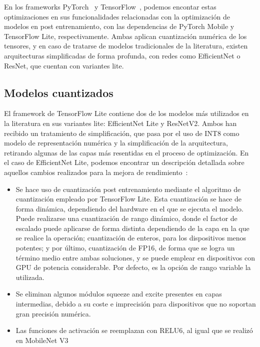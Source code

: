 En los frameworks PyTorch~\cite{paszke2019pytorch} y TensorFlow~\cite{tensorflow2015-whitepaper}, podemos encontar estas optimizaciones en sus funcionalidades relacionadas con la optimización de modelos en post entrenamiento, con las dependencias de PyTorch Mobile y TensorFlow Lite, respectivamente. Ambas aplican cuantización numérica de los tensores, y en caso de tratarse de modelos tradicionales de la literatura, existen arquitecturas simplificadas de forma profunda, con redes como EfficientNet o ResNet, que cuentan con variantes lite.

\subsection{Modelos cuantizados}

El framework de TensorFlow Lite contiene dos de los modelos más utilizados en la literatura en sus variantes lite: EfficientNet Lite y ResNetV2. Ambos han recibido un tratamiento de simplificación, que pasa por el uso de INT8 como modelo de representación numérica y la simplificación de la arquitectura, retirando algunas de las capas más resentidas en el proceso de optimización. En el caso de EfficientNet Lite, podemos encontrar un descripción detallada sobre aquellos cambios realizados para la mejora de rendimiento~\cite{eflite2}:

\begin{itemize}
	\item Se hace uso de cuantización post entrenamiento mediante el algoritmo de cuantización empleado por TensorFlow Lite. Esta cuantización se hace de forma dinámica, dependiendo del hardware en el que se ejecuta el modelo. Puede realizarse una cuantización de rango dinámico, donde el factor de escalado puede aplicarse de forma distinta dependiendo de la capa en la que se realice la operación; cuantización de enteros, para los dispositivos menos potentes; y 	por último, cuantización de FP16, de forma que se logra un término medio entre ambas soluciones, y se puede emplear en dispositivos con GPU de potencia considerable. Por defecto, es la opción de rango variable la utilizada.
	\item Se eliminan algunos módulos squeeze and excite presentes en capas intermedias, debido a su coste e imprecisión para dispositivos que no soportan gran precisión numérica.
	\item Las funciones de activación se reemplazan con RELU6, al igual que se realizó en MobileNet V3~\cite {howard2019searching} 
\end{itemize}

